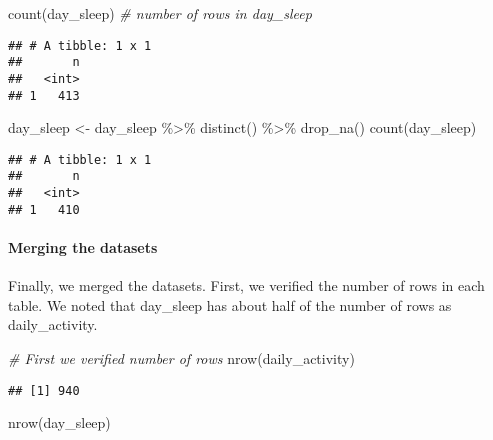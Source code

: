 \documentclass[
]{article}
\newenvironment{Shaded}{\begin{snugshade}}{\end{snugshade}}
\newcommand{\CommentTok}[1]{\textcolor[rgb]{0.56,0.35,0.01}{\textit{#1}}}
\newcommand{\FunctionTok}[1]{\textcolor[rgb]{0.00,0.00,0.00}{#1}}
\newcommand{\NormalTok}[1]{#1}
\newcommand{\OtherTok}[1]{\textcolor[rgb]{0.56,0.35,0.01}{#1}}
\newcommand{\SpecialCharTok}[1]{\textcolor[rgb]{0.00,0.00,0.00}{#1}}
\begin{document}
\begin{Shaded}
\begin{Highlighting}[]
\FunctionTok{count}\NormalTok{(day\_sleep)  }\CommentTok{\# number of rows in day\_sleep}
\end{Highlighting}
\end{Shaded}

\begin{verbatim}
## # A tibble: 1 x 1
##       n
##   <int>
## 1   413
\end{verbatim}

\begin{Shaded}
\begin{Highlighting}[]
\NormalTok{day\_sleep }\OtherTok{\textless{}{-}}\NormalTok{ day\_sleep }\SpecialCharTok{\%\textgreater{}\%}
  \FunctionTok{distinct}\NormalTok{() }\SpecialCharTok{\%\textgreater{}\%}
  \FunctionTok{drop\_na}\NormalTok{()}
\FunctionTok{count}\NormalTok{(day\_sleep)}
\end{Highlighting}
\end{Shaded}

\begin{verbatim}
## # A tibble: 1 x 1
##       n
##   <int>
## 1   410
\end{verbatim}

\hypertarget{merging-the-datasets}{%
\paragraph{Merging the datasets}\label{merging-the-datasets}}

Finally, we merged the datasets. First, we verified the number of rows
in each table. We noted that day\_sleep has about half of the number of
rows as daily\_activity.

\begin{Shaded}
\begin{Highlighting}[]
\CommentTok{\# First we verified number of rows}
\FunctionTok{nrow}\NormalTok{(daily\_activity)}
\end{Highlighting}
\end{Shaded}

\begin{verbatim}
## [1] 940
\end{verbatim}

\begin{Shaded}
\begin{Highlighting}[]
\FunctionTok{nrow}\NormalTok{(day\_sleep)}
\end{Highlighting}
\end{Shaded}
\end{document}
